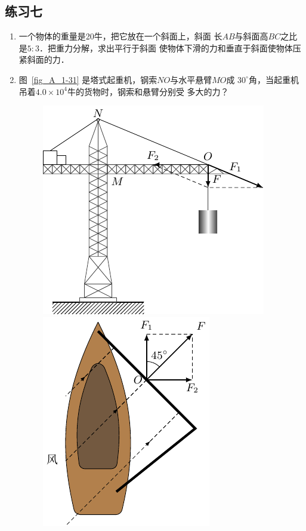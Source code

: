 \subsection*{练习七} 
\begin{enumerate} 

\item 一个物体的重量是20牛，把它放在一个斜面上，斜面
长$AB$与斜面高$BC$之比是$5:3$．把重力分解，求出平行于斜面
使物体下滑的力和垂直于斜面使物体压紧斜面的力．
 


\item 图~\ref{fig_A_1-31} 是塔式起重机，钢索$NO$与水平悬臂$MO$成
$30^\circ$角，当起重机吊着$4.0\times 10^4$牛的货物时，钢索和悬臂分别受
多大的力？
\begin{figure}[htbp]
	\centering
	\begin{minipage}[b]{0.48\textwidth} 
		\centering
		\includegraphics{fig/A/1-31.pdf} 
		\caption{} \label{fig_A_1-31} 
	\end{minipage} 
	\begin{minipage}[b]{0.48\textwidth}
		\centering
		\includegraphics{fig/A/1-32.pdf} 
		\caption{} \label{fig_A_1-32} 
	\end{minipage}
\end{figure} 


\end{enumerate}

